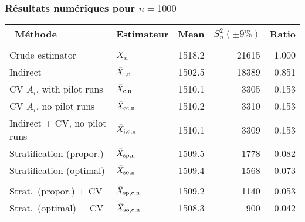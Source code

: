 \documentclass[t,usepdftitle=false]{beamer}
\begin{document}
\begin{frame}
\frametitle{Résultats numériques pour $n = 1000$}

\begin{small}
\begin{tabular}{llrrr}
\hline
    \ Méthode                & Estimateur
  & Mean   & $S_n^2 (\pm 9\%)$ & Ratio \\
\hline
&&&&\\
Crude estimator             & $\bar X_n$
  & 1518.2 & 21615  &  1.000 \\
Indirect                    & $\bar X_{\rm{i},n}$
  & 1502.5 & 18389  &  0.851 \\
CV $A_i$, with pilot runs   & $\bar X_{\rm{c},n}$
  & 1510.1 &  3305  &  0.153 \\
CV $A_i$, no pilot runs     & $\bar X_{\rm{c}e,n}$
  & 1510.2 &  3310  &  0.153 \\
Indirect + CV, no pilot runs & $\bar X_{\rm{i},\rm{c},n}$
  & 1510.1 &  3309  &  0.153 \\
Stratification (propor.)   & $\bar X_{\rm{s}p,n}$
  & 1509.5 &  1778  &  0.082 \\
Stratification (optimal)    & $\bar X_{\rm{s}o,n}$
  & 1509.4 &  1568  &  0.073 \\
 &&&& \\
Strat.\ (propor.) + CV & $\bar X_{\rm{s}p,\rm{c},n}$
  & 1509.2 &  1140  &  0.053 \\
Strat.\ (optimal) + CV & $\bar X_{\rm{s}o,\rm{c},n}$
  & 1508.3 &   900  &  0.042 \\
\hline
\end{tabular}
\end{small}

\end{frame}
\end{document}
